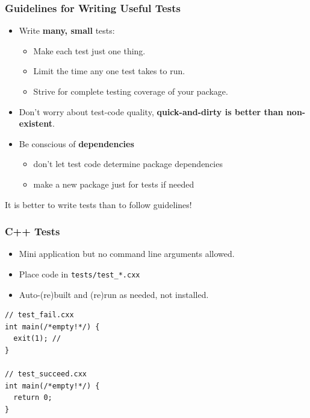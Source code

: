 \documentclass[xcolor=dvipsnames]{beamer}
\begin{document}
\begin{frame}
  \frametitle{Guidelines for Writing Useful Tests}
  \begin{itemize}
  \item Write \textbf{many, small} tests:
    \begin{itemize}
    \item Make each test just one thing.
    \item Limit the time any one test takes to run.
    \item Strive for complete testing coverage of your package.
    \end{itemize}
  \item Don't worry about test-code quality, \textbf{quick-and-dirty is better
    than non-existent}.
  \item Be conscious of \textbf{dependencies}
    \begin{itemize}
    \item don't let test code determine package dependencies
    \item make a new package just for tests if needed
    \end{itemize}
  \end{itemize}

  \vspace{3mm}

  It is better to write tests than to follow guidelines!
\end{frame}

\begin{frame}[fragile]
  \frametitle{C++ Tests}
  \begin{itemize}
  \item Mini application but no command line arguments allowed.
  \item Place code in \texttt{tests/test\_*.cxx}
  \item Auto-(re)built and (re)run as needed, not installed.
  \end{itemize}
  \begin{lstlisting}
// test_fail.cxx
int main(/*empty!*/) {
  exit(1); // 
}

// test_succeed.cxx
int main(/*empty!*/) {
  return 0;
}
  \end{lstlisting}

\end{frame}
\end{document}
